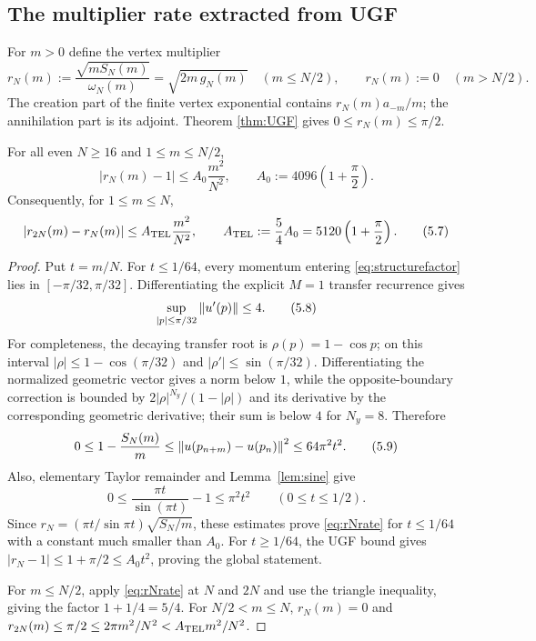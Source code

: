 \subsection{The multiplier rate extracted from UGF}

For $m>0$ define the vertex multiplier
\[
 r_N(m)
 :=\frac{\sqrt{mS_N(m)}}{\omega_N(m)}
 =\sqrt{2m\,g_N(m)}
\quad (m\le N/2),
\qquad
 r_N(m):=0\quad(m>N/2).
\tag{5.5}\label{eq:vertexmultiplier}
\]
The creation part of the finite vertex exponential contains
$r_N(m)a_{-m}/m$; the annihilation part is its adjoint.  Theorem
\ref{thm:UGF} gives $0\le r_N(m)\le\pi/2$.

\begin{lemma}\label{lem:multiplier}
For all even $N\ge16$ and $1\le m\le N/2$,
\[
 |r_N(m)-1|
 \le A_0\frac{m^2}{N^2},
\qquad
 A_0:=4096\left(1+\frac\pi2\right).
\tag{5.6}\label{eq:rNrate}
\]
Consequently, for $1\le m\le N$,
\[
 |r_{2N}(m)-r_N(m)|
 \le A_{\rm TEL}\frac{m^2}{N^2},
\qquad
 A_{\rm TEL}:=\frac54A_0
 =5120\left(1+\frac\pi2\right).
\tag{5.7}\label{eq:dyadicmultiplier}
\]
\end{lemma}

\begin{proof}
Put $t=m/N$.  For $t\le1/64$, every momentum entering
\eqref{eq:structurefactor} lies in $[-\pi/32,\pi/32]$.  Differentiating
the explicit $M=1$ transfer recurrence gives
\[
 \sup_{|p|\le\pi/32}\left\lVert u'(p)\right\rVert\le4.
\tag{5.8}\label{eq:edgederivative}
\]
For completeness, the decaying transfer root is
$\rho(p)=1-\cos p$; on this interval
$|\rho|\le1-\cos(\pi/32)$ and $|\rho'|\le\sin(\pi/32)$.
Differentiating the normalized geometric vector gives a norm below
$1$, while the opposite-boundary correction is bounded by
$2|\rho|^{N_y}/(1-|\rho|)$ and its derivative by the corresponding
geometric derivative; their sum is below $4$ for $N_y=8$.
Therefore
\[
 0\le1-\frac{S_N(m)}m
 \le\left\lVert u(p_{n+m})-u(p_n)\right\rVert^2
 \le64\pi^2t^2.
\tag{5.9}\label{eq:Srate}
\]
Also, elementary Taylor remainder and
Lemma~\ref{lem:sine} give
\[
 0\le\frac{\pi t}{\sin(\pi t)}-1\le\pi^2t^2
 \qquad(0\le t\le1/2).
\tag{5.10}\label{eq:symbolrate}
\]
Since
$r_N=(\pi t/\sin\pi t)\sqrt{S_N/m}$, these estimates prove
\eqref{eq:rNrate} for $t\le1/64$ with a constant much smaller than
$A_0$.  For $t\ge1/64$, the UGF bound gives
$|r_N-1|\le1+\pi/2\le A_0t^2$, proving the global statement.

For $m\le N/2$, apply \eqref{eq:rNrate} at $N$ and $2N$ and use the
triangle inequality, giving the factor $1+1/4=5/4$.  For
$N/2<m\le N$, $r_N(m)=0$ and
$r_{2N}(m)\le\pi/2\le2\pi m^2/N^2<A_{\rm TEL}m^2/N^2$.
\end{proof}

